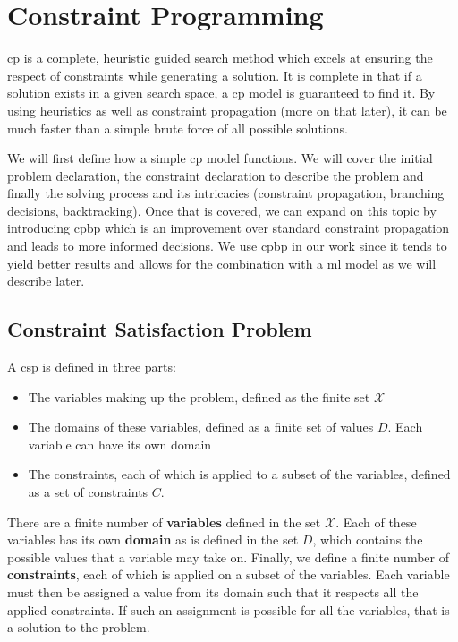 \documentclass[../Document.tex]{subfiles}
\begin{document}
\section{Constraint Programming}
\label{sec:intro/cp}
\acrlong{cp} is a complete, heuristic guided search method which excels at ensuring the respect of constraints while generating a solution. It is complete in that if a solution exists in a given search space, a \gls{cp} model is guaranteed to find it. By using heuristics as well as constraint propagation (more on that later), it can be much faster than a simple brute force of all possible solutions.

We will first define how a simple \gls{cp} model functions. We will cover the initial problem declaration, the constraint declaration to describe the problem and finally the solving process and its intricacies (constraint propagation, branching decisions, backtracking).
Once that is covered, we can expand on this topic by introducing \gls{cpbp} which is an improvement over standard constraint propagation and leads to more informed decisions. We use \gls{cpbp} in our work since it tends to yield better results and allows for the combination with a \gls{ml} model as we will describe later.

\subsection{Constraint Satisfaction Problem}
A \gls{csp} is defined in three parts:
\begin{itemize}
    \item The variables making up the problem, defined as the finite set $\mathcal{X}$
    \item The domains of these variables, defined as a finite set of values $D$. Each variable can have its own domain
    \item The constraints, each of which is applied to a subset of the variables, defined as a set of constraints $C$.
\end{itemize}

There are a finite number of \textbf{variables} defined in the set $\mathcal{X}$. Each of these variables has its own \textbf{domain} as is defined in the set $D$, which contains the possible values that a variable may take on. Finally, we define a finite number of \textbf{constraints}, each of which is applied on a subset of the variables. Each variable must then be assigned a value from its domain such that it respects all the applied constraints. If such an assignment is possible for all the variables, that is a solution to the problem.
\end{document}
